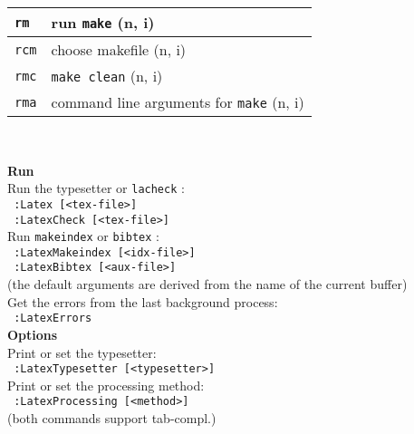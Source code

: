 \documentclass[oneside,10pt,landscape,DIV16]{scrartcl}
\newcommand{\Map}[1] {\textbf{\textasciiacute}\texttt{#1}}
\begin{document}
\begin{multicols}{3}
\begin{center}
\begin{tabular}[]{|p{11mm}|p{62mm}|}
\hline \Map{rm}  & run \texttt{make}                        \hfill (n, i)   \\
\hline \Map{rcm} & choose makefile                          \hfill (n, i)   \\
\hline \Map{rmc} & \texttt{make clean}                      \hfill (n, i)   \\
\hline \Map{rma} & command line arguments for \texttt{make} \hfill (n, i)   \\
\hline
\end{tabular}\\
%
%
\parbox[t][130mm][t]{70mm}{
%
\large{\textbf{Run}}\\[1.0ex]
Run the typesetter or \texttt{lacheck} : \\[1.0ex]
\texttt{ :Latex [<tex-file>]} \\[1.0ex]
\texttt{ :LatexCheck [<tex-file>]} \\[1.0ex]
Run \texttt{makeindex} or \texttt{bibtex} : \\[1.0ex]
\texttt{ :LatexMakeindex [<idx-file>]} \\[1.0ex]
\texttt{ :LatexBibtex [<aux-file>]} \\[1.0ex]
(the default arguments are derived from the name of the current buffer) \\[2.5ex]
Get the errors from the last background process: \\[1.0ex]
\texttt{ :LatexErrors} \\[2.5ex]
%
\large{\textbf{Options}}\\[1.0ex]
Print or set the typesetter: \\[1.0ex]
\texttt{ :LatexTypesetter [<typesetter>]} \\[1.0ex]
Print or set the processing method: \\[1.0ex]
\texttt{ :LatexProcessing [<method>]} \\[1.0ex]
(both commands support tab-compl.) \\[2.5ex]
%
}
\end{center}
\end{multicols}
\end{document}
